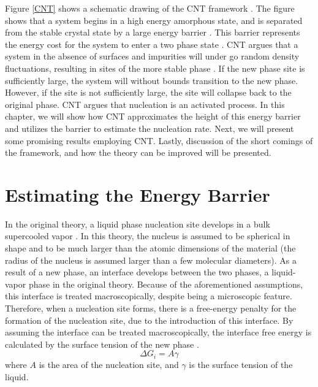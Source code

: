 Figure \ref{CNT} shows a schematic drawing of the CNT framework \cite{debenedetti1996metastable}.  The figure shows that a system begins in a high energy amorphous state, and is separated from the stable crystal state by a large energy barrier \cite{debenedetti1996metastable}.  This barrier represents the energy cost for the system to enter a two phase state \cite{debenedetti1996metastable}.  CNT argues that a system in the absence of surfaces and impurities will under go random density fluctuations, resulting in sites of the more stable phase \cite{debenedetti1996metastable}.  If the new phase site is sufficiently large, the system will without bounds transition to the new phase.  However, if the site is not sufficiently large, the site will collapse back to the original phase.  CNT argues that nucleation is an activated process.  In this chapter, we will show how CNT approximates the height of this energy barrier and utilizes the barrier to estimate the nucleation rate.  Next, we will present some promising results employing CNT.  Lastly, discussion of the short comings of the framework, and how the theory can be improved will be presented.

\section{Estimating the Energy Barrier}
In the original theory, a liquid phase nucleation site develops in a bulk supercooled vapor \cite{mutaftschiev2001atomistic}.  In this theory, the nucleus is assumed to be spherical in shape and to be much larger than the atomic dimensions of the material (the radius of the nucleus is assumed larger than a few molecular diameters).  As a result of a new phase, an interface develops between the two phases, a liquid-vapor phase in the original theory.  Because of the aforementioned assumptions, this interface is treated macroscopically, despite being a microscopic feature.  Therefore, when a nucleation site forms, there is a free-energy penalty for the formation of the nucleation site, due to the introduction of this interface.  By assuming the interface can be treated macroscopically, the interface free energy is calculated by the surface tension of the new phase \cite{mutaftschiev2001atomistic}.
\begin{equation}
	\Delta G_{i} = A\gamma 
\end{equation}
where $A$ is the area of the nucleation site, and $\gamma$ is the surface tension of the liquid.

